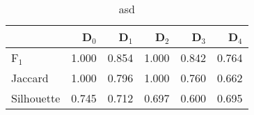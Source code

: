 \begin{table}
\centering
\caption{asd}
\label{tab:s1-cont-eca-single}
\begin{tabular}{lrrrrr}
\toprule
{} &  D$_0$ &  D$_1$ &  D$_2$ &  D$_3$ &  D$_4$ \\
\midrule
F$_1$      &  1.000 &  0.854 &  1.000 &  0.842 &  0.764 \\
Jaccard    &  1.000 &  0.796 &  1.000 &  0.760 &  0.662 \\
Silhouette &  0.745 &  0.712 &  0.697 &  0.600 &  0.695 \\
\bottomrule
\end{tabular}
\end{table}
